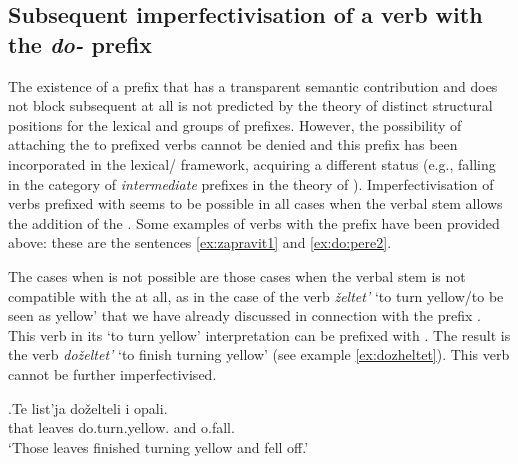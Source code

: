 \subsection{Subsequent imperfectivisation of a verb with the \textit{do-} prefix}
The existence of a prefix that has a transparent semantic contribution and does not block subsequent  at all is not predicted by the theory of distinct structural positions for the lexical and  groups of prefixes. However, the possibility of attaching the  to prefixed verbs cannot be denied and this prefix has been incorporated in the lexical/ framework, acquiring a different status (e.g., falling in the category of \textit{intermediate} prefixes in the theory of \citealt{Tatevosov:07}). Imperfectivisation of verbs prefixed with  seems to be possible in all cases when the verbal stem allows the addition of the . Some examples of  verbs with the prefix  have been provided above: these are the sentences \ref{ex:zapravit1} and \ref{ex:do:pere2}.

The cases when  is not possible are those cases when the verbal stem is not compatible with the  at all, as in the case of the verb \textit{\v{z}eltet'} `to turn yellow/to be seen as yellow' that we have already discussed in connection with the prefix . This verb in its `to turn yellow' interpretation can be prefixed with . The result is the verb \textit{do\v{z}eltet'} `to finish turning yellow' (see example \ref{ex:dozheltet}). This verb cannot be further imperfectivised. 

\exg.\label{ex:dozheltet}Te list'ja do\v{z}elteli i opali.\\
that leaves do.turn.yellow. and o.fall.\\
\trans `Those leaves finished turning yellow and fell off.'\\

